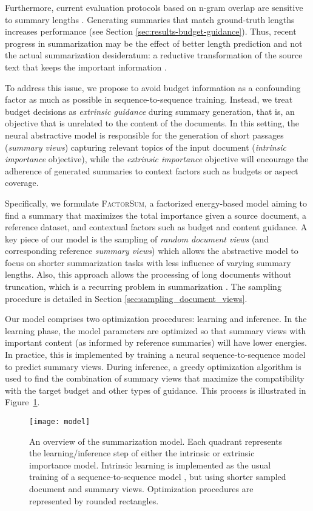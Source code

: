 \documentclass[11pt,table]{article}
\newcommand{\modelname}{FactorSum}
\begin{document}
Furthermore, current evaluation protocols based on n-gram overlap are sensitive to summary lengths \cite{sun2019compare}. Generating summaries that match ground-truth lengths increases performance (see Section \ref{sec:results-budget-guidance}). Thus, recent progress in summarization may be the effect of better length prediction and not the actual summarization desideratum: a reductive transformation of the source text that keeps the important information \citep{jones1999automatic}.

To address this issue, we propose to avoid budget information as a confounding factor as much as possible in sequence-to-sequence training. Instead, we treat budget decisions as \emph{extrinsic guidance} during summary generation, that is, an objective that is unrelated to the content of the documents. In this setting, the neural abstractive model is responsible for the generation of short passages (\emph{summary views}) capturing relevant topics of the input document (\emph{intrinsic importance} objective), while the \emph{extrinsic importance} objective will encourage the adherence of generated summaries to context factors such as budgets or aspect coverage.

Specifically, we formulate \textsc{\modelname}, a factorized energy-based model \citep{lecun2006tutorial} aiming to find a summary that maximizes the total importance given a source document, a reference dataset, and contextual factors such as budget and content guidance. A key piece of our model is the sampling of \emph{random document views} (and corresponding reference \emph{summary views}) which allows the abstractive model to focus on shorter summarization tasks with less influence of varying summary lengths. Also, this approach allows the processing of long documents without truncation, which is a recurring problem in summarization \citep{beltagy2020longformer,zaheer2020big}. The sampling procedure is detailed in Section \ref{sec:sampling_document_views}.

Our model comprises two optimization procedures: learning and inference. In the learning phase, the model parameters are optimized so that summary views with important content (as informed by reference summaries) will have lower energies. In practice, this is implemented by training a neural sequence-to-sequence model to predict summary views. During inference, a greedy optimization algorithm is used to find the combination of summary views that maximize the compatibility with the target budget and other types of guidance. This process is illustrated in Figure~\ref{fig:model_overview}.
\begin{figure}
    \centering
    \texttt{[image: model]}
    \caption{An overview of the summarization model. Each quadrant represents the learning/inference step of either the intrinsic or extrinsic importance model. Intrinsic learning is implemented as the usual training of a sequence-to-sequence model , but using shorter sampled document and summary views. Optimization procedures are represented by rounded rectangles.}\label{fig:model_overview}
\end{figure}
\end{document}
